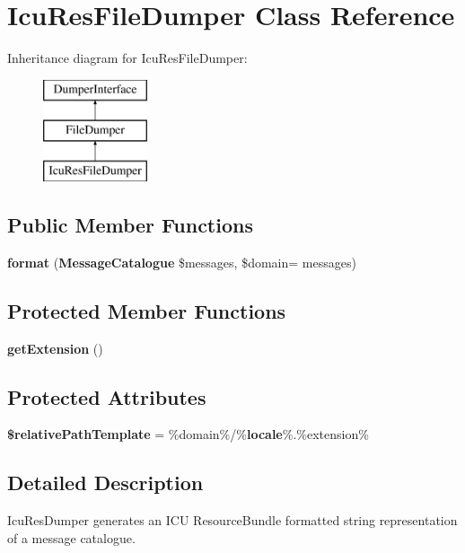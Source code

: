 \section{Icu\+Res\+File\+Dumper Class Reference}
\label{class_symfony_1_1_component_1_1_translation_1_1_dumper_1_1_icu_res_file_dumper}
Inheritance diagram for Icu\+Res\+File\+Dumper\+:\begin{figure}[H]
\begin{center}
\leavevmode
\includegraphics[height=3.000000cm]{class_symfony_1_1_component_1_1_translation_1_1_dumper_1_1_icu_res_file_dumper}
\end{center}
\end{figure}
\subsection*{Public Member Functions}
\begin{DoxyCompactItemize}
\item 
{\bf format} ({\bf Message\+Catalogue} \$messages, \$domain= \textquotesingle{}messages\textquotesingle{})
\end{DoxyCompactItemize}
\subsection*{Protected Member Functions}
\begin{DoxyCompactItemize}
\item 
{\bf get\+Extension} ()
\end{DoxyCompactItemize}
\subsection*{Protected Attributes}
\begin{DoxyCompactItemize}
\item 
{\bf \$relative\+Path\+Template} = \textquotesingle{}\%domain\%/\%{\bf locale}\%.\%extension\%\textquotesingle{}
\end{DoxyCompactItemize}


\subsection{Detailed Description}
Icu\+Res\+Dumper generates an I\+C\+U Resource\+Bundle formatted string representation of a message catalogue.

